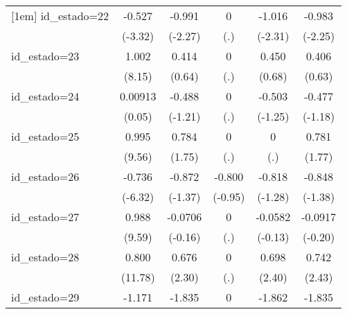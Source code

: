 {\begin{tabular}{l*{5}{c}}
[1em]
id\_estado=22        &      -0.527\sym{***}&      -0.991\sym{*}  &           0         &      -1.016\sym{*}  &      -0.983\sym{*}  \\
                    &     (-3.32)         &     (-2.27)         &         (.)         &     (-2.31)         &     (-2.25)         \\
[1em]
id\_estado=23        &       1.002\sym{***}&       0.414         &           0         &       0.450         &       0.406         \\
                    &      (8.15)         &      (0.64)         &         (.)         &      (0.68)         &      (0.63)         \\
[1em]
id\_estado=24        &     0.00913         &      -0.488         &           0         &      -0.503         &      -0.477         \\
                    &      (0.05)         &     (-1.21)         &         (.)         &     (-1.25)         &     (-1.18)         \\
[1em]
id\_estado=25        &       0.995\sym{***}&       0.784         &           0         &           0         &       0.781         \\
                    &      (9.56)         &      (1.75)         &         (.)         &         (.)         &      (1.77)         \\
[1em]
id\_estado=26        &      -0.736\sym{***}&      -0.872         &      -0.800         &      -0.818         &      -0.848         \\
                    &     (-6.32)         &     (-1.37)         &     (-0.95)         &     (-1.28)         &     (-1.38)         \\
[1em]
id\_estado=27        &       0.988\sym{***}&     -0.0706         &           0         &     -0.0582         &     -0.0917         \\
                    &      (9.59)         &     (-0.16)         &         (.)         &     (-0.13)         &     (-0.20)         \\
[1em]
id\_estado=28        &       0.800\sym{***}&       0.676\sym{*}  &           0         &       0.698\sym{*}  &       0.742\sym{*}  \\
                    &     (11.78)         &      (2.30)         &         (.)         &      (2.40)         &      (2.43)         \\
[1em]
id\_estado=29        &      -1.171\sym{***}&      -1.835\sym{**} &           0         &      -1.862\sym{**} &      -1.835\sym{**} \\

\end{tabular}}
